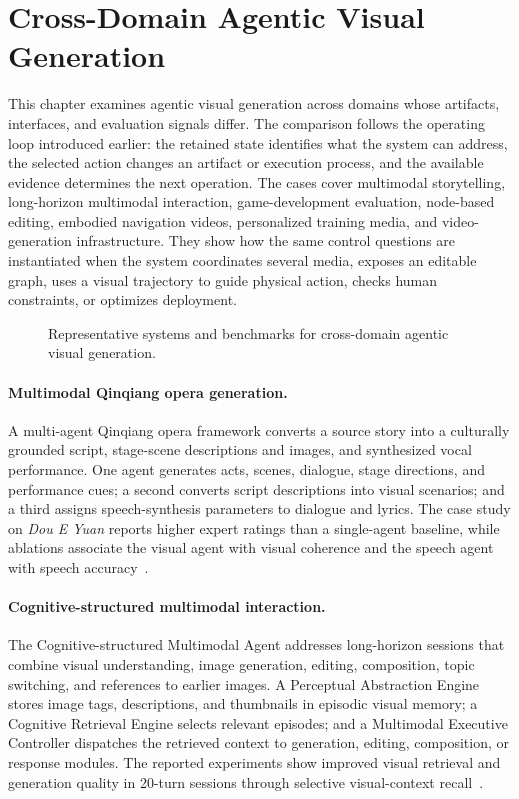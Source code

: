 \section{Cross-Domain Agentic Visual Generation}
\label{sec:cross-domain}

This chapter examines agentic visual generation across domains whose artifacts, interfaces, and evaluation signals differ. The comparison follows the operating loop introduced earlier: the retained state identifies what the system can address, the selected action changes an artifact or execution process, and the available evidence determines the next operation. The cases cover multimodal storytelling, long-horizon multimodal interaction, game-development evaluation, node-based editing, embodied navigation videos, personalized training media, and video-generation infrastructure. They show how the same control questions are instantiated when the system coordinates several media, exposes an editable graph, uses a visual trajectory to guide physical action, checks human constraints, or optimizes deployment.




\begin{figure}[!htbp]
  \centering
  
  \caption{Representative systems and benchmarks for cross-domain agentic visual generation.}
  \label{fig:ch10-representative-systems}
\end{figure}

\paragraph{Multimodal Qinqiang opera generation.}
A multi-agent Qinqiang opera framework converts a source story into a culturally grounded script, stage-scene descriptions and images, and synthesized vocal performance. One agent generates acts, scenes, dialogue, stage directions, and performance cues; a second converts script descriptions into visual scenarios; and a third assigns speech-synthesis parameters to dialogue and lyrics. The case study on \emph{Dou E Yuan} reports higher expert ratings than a single-agent baseline, while ablations associate the visual agent with visual coherence and the speech agent with speech accuracy~\cite{avg250415552}.

\paragraph{Cognitive-structured multimodal interaction.}
The Cognitive-structured Multimodal Agent addresses long-horizon sessions that combine visual understanding, image generation, editing, composition, topic switching, and references to earlier images. A Perceptual Abstraction Engine stores image tags, descriptions, and thumbnails in episodic visual memory; a Cognitive Retrieval Engine selects relevant episodes; and a Multimodal Executive Controller dispatches the retrieved context to generation, editing, composition, or response modules. The reported experiments show improved visual retrieval and generation quality in 20-turn sessions through selective visual-context recall~\cite{avg260708497}.

